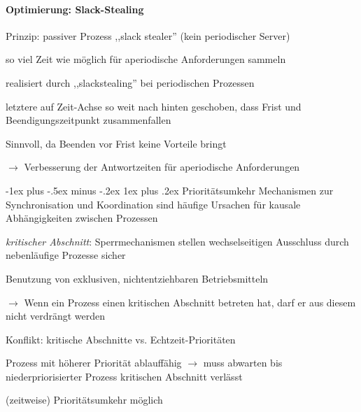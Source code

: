 \documentclass[a4paper]{article}
\makeatletter
\renewcommand{\subsubsection}{\@startsection{subsubsection}{3}{0mm}%
 {-1ex plus -.5ex minus -.2ex}%
 {1ex plus .2ex}%
 {\normalfont\small\bfseries}}
\makeatother
\begin{document}
\begin{multicols}{3}
    \paragraph{Optimierung: Slack-Stealing}
    \begin{itemize*}
        \item Prinzip: passiver Prozess ,,slack stealer'' (kein periodischer Server)
        \item so viel Zeit wie möglich für aperiodische Anforderungen sammeln
        \item realisiert durch ,,slackstealing'' bei periodischen Prozessen
        \item letztere auf Zeit-Achse so weit nach hinten geschoben, dass Frist und Beendigungszeitpunkt zusammenfallen
        \item Sinnvoll, da Beenden vor Frist keine Vorteile bringt
        \item[$\rightarrow$] Verbesserung der Antwortzeiten für aperiodische Anforderungen
    \end{itemize*}

    \subsubsection{Prioritätsumkehr}
    Mechanismen zur Synchronisation und Koordination sind häufige Ursachen für kausale Abhängigkeiten zwischen Prozessen
    \begin{itemize*}
        \item \emph{kritischer Abschnitt}: Sperrmechanismen stellen wechselseitigen Ausschluss durch nebenläufige Prozesse sicher
        \item Benutzung von exklusiven, nichtentziehbaren Betriebsmitteln
        \item[$\rightarrow$] Wenn ein Prozess einen kritischen Abschnitt betreten hat, darf er aus diesem nicht verdrängt werden %
        \item Konflikt: kritische Abschnitte vs. Echtzeit-Prioritäten
        \item Prozess mit höherer Priorität ablauffähig $\rightarrow$ muss abwarten bis niederpriorisierter Prozess kritischen Abschnitt verlässt
        \item (zeitweise) Prioritätsumkehr möglich%
    \end{itemize*}


\end{multicols}
\end{document}

